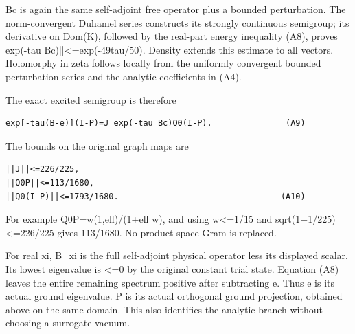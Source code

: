 \documentclass[11pt,a4paper]{article}
\renewcommand{\[}{\begingroup\small\originaldisplaystart}
\renewcommand{\]}{\originaldisplayend\endgroup}
\begin{document}
Bc is again the same self-adjoint free operator plus a bounded
perturbation. The norm-convergent Duhamel series constructs its strongly
continuous semigroup; its derivative on Dom(K), followed by the
real-part energy inequality (A8), proves \textbar\textbar exp(-tau
{B\allowbreak{}c\allowbreak{})\allowbreak{}|\allowbreak{}|\allowbreak{}\textless{}\allowbreak{}=\allowbreak{}e\allowbreak{}x\allowbreak{}p\allowbreak{}(\allowbreak{}-\allowbreak{}4\allowbreak{}9\allowbreak{}t\allowbreak{}a\allowbreak{}u\allowbreak{}/\allowbreak{}5\allowbreak{}0\allowbreak{})\allowbreak{}.\allowbreak{}}
Density extends this estimate to all vectors. Holomorphy in zeta follows
locally from the uniformly convergent bounded perturbation series and
the analytic coefficients in (A4).

The exact excited semigroup is therefore

\begin{verbatim}
exp[-tau(B-e)](I-P)=J exp(-tau Bc)Q0(I-P).               (A9)
\end{verbatim}

The bounds on the original graph maps are

\begin{verbatim}
||J||<=226/225,
||Q0P||<=113/1680,
||Q0(I-P)||<=1793/1680.                                 (A10)
\end{verbatim}

For example
{Q\allowbreak{}0\allowbreak{}P\allowbreak{}=\allowbreak{}w\allowbreak{}(\allowbreak{}1\allowbreak{},\allowbreak{}e\allowbreak{}l\allowbreak{}l\allowbreak{})\allowbreak{}/\allowbreak{}(\allowbreak{}1\allowbreak{}+\allowbreak{}e\allowbreak{}l\allowbreak{}l\allowbreak{}}
w), and using \textbar\textbar w\textbar\textbar\textless=1/15 and
{s\allowbreak{}q\allowbreak{}r\allowbreak{}t\allowbreak{}(\allowbreak{}1\allowbreak{}+\allowbreak{}1\allowbreak{}/\allowbreak{}2\allowbreak{}2\allowbreak{}5\allowbreak{})\allowbreak{}\textless{}\allowbreak{}=\allowbreak{}2\allowbreak{}2\allowbreak{}6\allowbreak{}/\allowbreak{}2\allowbreak{}2\allowbreak{}5\allowbreak{}}
gives 113/1680. No product-space Gram is replaced.

For real xi, B\_xi is the full self-adjoint physical operator less its
displayed scalar. Its lowest eigenvalue is \textless=0 by the original
constant trial state. Equation (A8) leaves the entire remaining spectrum
positive after subtracting e. Thus e is its actual ground eigenvalue. P
is its actual orthogonal ground projection, obtained above on the same
domain. This also identifies the analytic branch without choosing a
surrogate vacuum.
\end{document}
